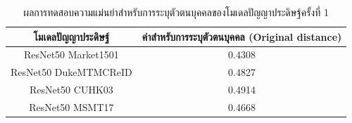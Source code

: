 \begin{table}[!ht]
    \centering
    \begin{tabular}{|c|c|}
        \hline
        {โมเดลปัญญาประดิษฐ์}&{ค่าสำหรับการระบุตัวตนบุคคล (Original distance)}							\\
        \hline
        ResNet50 Market1501	 			& 0.4308								\\
        ResNet50 DukeMTMCReID			& 0.4827								\\
        ResNet50 CUHK03				& 0.4914								\\
        ResNet50 MSMT17				& 0.4668								\\
        \hline
    \end{tabular}
    \caption{ผลการทดสอบความแม่นยำสำหรับการระบุตัวตนบุคคลของโมเดลปัญญาประดิษฐ์ครั้งที่ 1}
    \label{tab: Original distant of image 1}
\end{table}
\clearpage

